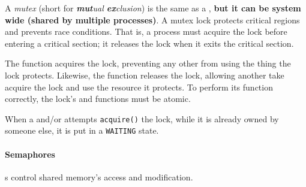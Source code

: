\begin{definition}[Mutex]\label{def:Mutex}
  A \emph{mutex} (short for \emph{\textbf{mut}ual \textbf{ex}clusion}) is the same as a , \textbf{but it can be system wide (shared by multiple processes)}.
  A mutex lock protects critical regions and prevents race conditions.
  That is, a process must acquire the lock before entering a critical section; it releases the lock when it exits the critical section.

  The  function acquires the lock, preventing any other  from using the thing the lock protects.
  Likewise, the  function releases the lock, allowing another  take acquire the lock and use the resource it protects.
  To perform its function correctly, the lock's  and  functions must be atomic.

  When a  and/or  attempts \texttt{acquire()} the lock, while it is already owned by someone else, it is put in a \texttt{WAITING} state.
\end{definition}

\paragraph{Semaphores}\label{par:Semaphores}
s control shared memory's access and modification.

